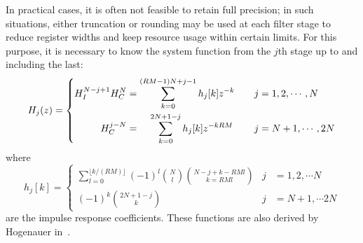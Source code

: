 In practical cases, it is often not feasible to retain full precision; in such
situations, either truncation or rounding may  be used at each filter stage to
reduce register widths and keep resource usage within certain limits. For this
purpose, it is necessary  to know the system function from  the $j$th stage up
to and including the last:
\begin{equation}
    \label{eq:cic:truncation_rounding:system_function}
    H_j(z) = \left\lbrace
        \begin{aligned}
            H_I^{N-j+1}H_C^N                        &
            = \sum_{k=0}^{(RM-1)N+j-1} h_j[k]z^{-k} &
            \quad j                                 &
            = 1, 2, \cdots, N                       \\
            H_C^{j-N}                                          &
            = \hspace{1.1em}\sum_{k=0}^{2N+1-j} h_j[k]z^{-kRM} &
            \quad j                                            &
            = N+1, \cdots, 2N
        \end{aligned}
    \right.
\end{equation}
where
\begin{equation}
    \label{eq:cic:truncation_rounding:system_function}
    h_j[k] = \left\lbrace
        \begin{aligned}
            \sum_{l=0}^{\lfloor k/(RM) \rfloor} (-1)^l 
            {{N}\choose{l}}{{N-j+k-RMl}\choose{k = RMl}} &
            j                                            &
            = 1, 2, \cdots N                             \\
            (-1)^k{{2N+1-j}\choose{k}} &
            j                          &
            = N+1, \cdots 2N
        \end{aligned}
    \right.
\end{equation}
are the  impulse response  coefficients. These functions  are also  derived by
Hogenauer in~\cite{1163535}.

